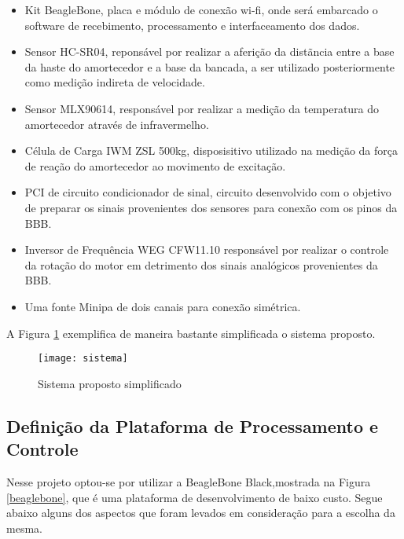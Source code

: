	\begin{itemize}

	\item Kit BeagleBone, placa e módulo de conexão wi-fi, onde será embarcado o software de recebimento, processamento e interfaceamento dos dados.
	\item Sensor HC-SR04, reponsável por realizar a aferição da distãncia entre a base da haste do amortecedor e a base da bancada, a ser utilizado posteriormente como medição indireta de velocidade.
	\item Sensor MLX90614, responsável por realizar a medição da temperatura do amortecedor através de infravermelho.
	\item Célula de Carga IWM ZSL 500kg, disposisitivo utilizado na medição da força de reação do amortecedor ao movimento de excitação.
	\item PCI de circuito condicionador de sinal, circuito desenvolvido com o objetivo de preparar os sinais provenientes dos sensores para conexão com os pinos da BBB. 
	\item Inversor de Frequência WEG CFW11.10 responsável por realizar o controle da rotação do motor em detrimento dos sinais analógicos provenientes da BBB.
	\item Uma fonte Minipa de dois canais para conexão simétrica.
	\end{itemize}		

	A Figura \ref{sistema} exemplifica de maneira bastante simplificada o sistema proposto. 

	\begin{figure}[!h]
		\centering
		\texttt{[image: sistema]}
		\caption{Sistema proposto simplificado}
		\label{sistema}
	\end{figure}


\subsection{Definição da Plataforma de Processamento e Controle}

	Nesse projeto optou-se por utilizar a BeagleBone Black,mostrada na Figura \ref{beaglebone}, que é uma plataforma de desenvolvimento de baixo custo. Segue abaixo alguns dos aspectos que foram levados em consideração para a escolha da mesma.

